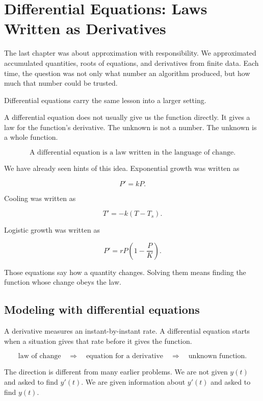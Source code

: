 
\chapter{Differential Equations: Laws Written as Derivatives}
\label{chap:differential-equations}

The last chapter was about approximation with responsibility.  We approximated
accumulated quantities, roots of equations, and derivatives from finite data.  Each
time, the question was not only what number an algorithm produced, but how much
that number could be trusted.

Differential equations carry the same lesson into a larger setting.

A differential equation does not usually give us the function directly.  It gives a law
for the function's derivative.  The unknown is not a number.  The unknown is a whole
function.

\[
\boxed{
\text{A differential equation is a law written in the language of change.}
}
\]

We have already seen hints of this idea.  Exponential growth was written as

\[
P'=kP.
\]

Cooling was written as

\[
T'=-k(T-T_s).
\]

Logistic growth was written as

\[
P'=rP\left(1-\frac{P}{K}\right).
\]

Those equations say how a quantity changes.  Solving them means finding the
function whose change obeys the law.

\section{Modeling with differential equations}
\label{sec:modeling-with-differential-equations}

A derivative measures an instant-by-instant rate.  A differential equation starts when a
situation gives that rate before it gives the function.

\[
\text{law of change}
\quad\Longrightarrow\quad
\text{equation for a derivative}
\quad\Longrightarrow\quad
\text{unknown function}.
\]

The direction is different from many earlier problems.  We are not given \(y(t)\) and
asked to find \(y'(t)\).  We are given information about \(y'(t)\) and asked to find
\(y(t)\).


